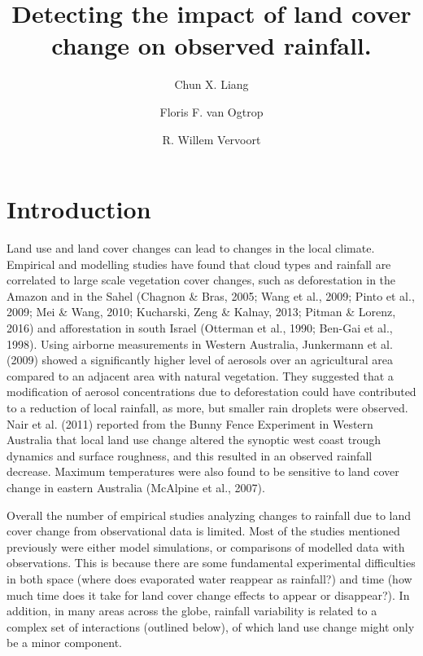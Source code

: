 \documentclass[fleqn,10pt,lineno]{wlpeerj} %
\title{Detecting the impact of land cover change on observed rainfall.}
\author[1]{Chun X. Liang}
\author[1]{Floris F. van Ogtrop}
\author[1]{R. Willem Vervoort}
\affil[1]{School of Life and Environmental Sciences, Sydney Institute of
Agriculture, The University of Sydney, New South Wales, Australia.}
\theoremstyle{definition}
\theoremstyle{definition}
\theoremstyle{definition}
\theoremstyle{remark}
\begin{document}
\flushbottom
\maketitle
\thispagestyle{empty}

\section*{Introduction}\label{introduction}

Land use and land cover changes can lead to changes in the local
climate. Empirical and modelling studies have found that cloud types and
rainfall are correlated to large scale vegetation cover changes, such as
deforestation in the Amazon and in the Sahel (Chagnon \& Bras, 2005;
Wang et al., 2009; Pinto et al., 2009; Mei \& Wang, 2010; Kucharski,
Zeng \& Kalnay, 2013; Pitman \& Lorenz, 2016) and afforestation in south
Israel (Otterman et al., 1990; Ben-Gai et al., 1998). Using airborne
measurements in Western Australia, Junkermann et al. (2009) showed a
significantly higher level of aerosols over an agricultural area
compared to an adjacent area with natural vegetation. They suggested
that a modification of aerosol concentrations due to deforestation could
have contributed to a reduction of local rainfall, as more, but smaller
rain droplets were observed. Nair et al. (2011) reported from the Bunny
Fence Experiment in Western Australia that local land use change altered
the synoptic west coast trough dynamics and surface roughness, and this
resulted in an observed rainfall decrease. Maximum temperatures were
also found to be sensitive to land cover change in eastern Australia
(McAlpine et al., 2007).

Overall the number of empirical studies analyzing changes to rainfall
due to land cover change from observational data is limited. Most of the
studies mentioned previously were either model simulations, or
comparisons of modelled data with observations. This is because there
are some fundamental experimental difficulties in both space (where does
evaporated water reappear as rainfall?) and time (how much time does it
take for land cover change effects to appear or disappear?). In
addition, in many areas across the globe, rainfall variability is
related to a complex set of interactions (outlined below), of which land
use change might only be a minor component.
\end{document}
